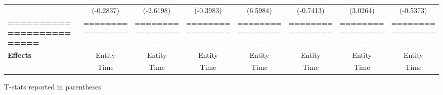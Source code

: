 \begin{center}
\begin{tabular}{lccccccc}
\textbf{ }                         &      (-0.2837)       &          (-2.6198)          &          (-0.3983)           &               (6.5984)              &            (-0.7413)             &           (3.0264)          &           (-0.5373)            \\
\textbf{=========================} &  ==================  &      ==================     &      ==================      &          ==================         &        ==================        &      ==================     &       ==================       \\
\textbf{Effects}                   &        Entity        &            Entity           &            Entity            &                Entity               &              Entity              &            Entity           &             Entity             \\
\textbf{}                          &         Time         &             Time            &             Time             &                 Time                &               Time               &             Time            &              Time              \\
\bottomrule
\end{tabular}
\end{center}

T-stats reported in parentheses